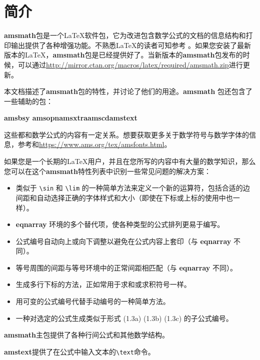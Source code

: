 \documentclass[openany]{ctexbook}
\begin{document}
\tableofcontents
\mainmatter
\chapter{简介}

{\bfseries amsmath}包是一个\LaTeX 软件包，它为改进包含数学公式的文档的信息结构和打印输出提供了各种增强功能。不熟悉\LaTeX 的读者可知参考  \cite{3} 。如果您安装了最新版本的\LaTeX ，{\bfseries amsmath}包是已经提供好了。当新版本的{\bfseries amsmath}包发布的时候，可以通过\href{http://mirror.ctan.org/macros/latex/required/amsmath.zip}{http://mirror.ctan.org/macros/latex/required/amsmath.zip}进行更新。

本文档描述了{\bfseries amsmath}包的特性，并讨论了他们的用途。{\bfseries amsmath} 包还包含了一些辅助的包：
\begin{center}
\bfseries amsbsy \quad amsopn\quad amsxtra\quad amscd\quad amstext
\end{center}
这些都和数学公式的内容有一定关系。想要获取更多关于数学符号与数学字体的信息，参考\cite{8}和\href{https://www.ams.org/tex/amsfonts.html}{https://www.ams.org/tex/amsfonts.html}。

如果您是一个长期的\LaTeX 用户，并且在您所写的内容中有大量的数学知识，那么您可以在这个{\bfseries amsmath}特性列表中识别一些常见问题的解决方案：

\begin{itemize}
\item 类似于 \verb|\sin| 和 \verb|\lim| 的一种简单方法来定义一个新的运算符，包括合适的边间距和自动选择正确的字体样式和大小（即使在下标或上标的使用中也一样）。
\item {\bfseries eqnarray} 环境的多个替代项，使各种类型的公式排列更易于编写。
\item 公式编号自动向上或向下调整以避免在公式内容上套印（与 {\bfseries eqnarray} 不同）。
\item 等号周围的间距与等号环境中的正常间距相匹配（与 {\bfseries eqnarray} 不同）。
\item 生成多行下标的方法，正如常用于求和或求积符号一样。
\item 用可变的公式编号代替手动编号的一种简单方法。
\item 一种对选定的公式生成类似于形式 (1.3a) (1.3b) (1.3c) 的子公式编号。
\end{itemize}

{\bfseries amsmath}主包提供了各种行间公式和其他数学结构。

{\bfseries amstext}提供了在公式中输入文本的\verb|\text|命令。
\end{document}
